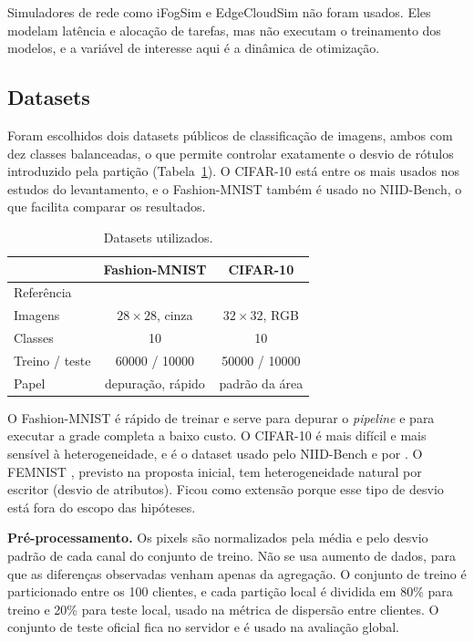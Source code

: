 Simuladores de rede como iFogSim e EdgeCloudSim não foram usados. Eles modelam latência e alocação de tarefas, mas não executam o treinamento dos modelos, e a variável de interesse aqui é a dinâmica de otimização.

\subsection{Datasets}

Foram escolhidos dois datasets públicos de classificação de imagens, ambos com dez classes balanceadas, o que permite controlar exatamente o desvio de rótulos introduzido pela partição (Tabela~\ref{tab:datasets}). O CIFAR-10 está entre os mais usados nos estudos do levantamento, e o Fashion-MNIST também é usado no NIID-Bench, o que facilita comparar os resultados.

\begin{table}[ht]
    \centering\small
    \caption{Datasets utilizados.}
    \label{tab:datasets}
    \begin{tabular}{@{}lcc@{}}
        \toprule
        & Fashion-MNIST & CIFAR-10 \\
        \midrule
        Referência & \citet{xiao2017fashion} & \citet{krizhevsky2009cifar} \\
        Imagens & $28\times28$, cinza & $32\times32$, RGB \\
        Classes & 10 & 10 \\
        Treino / teste & \num{60000} / \num{10000} & \num{50000} / \num{10000} \\
        Papel & depuração, rápido & padrão da área \\
        \bottomrule
    \end{tabular}
\end{table}

O Fashion-MNIST é rápido de treinar e serve para depurar o \textit{pipeline} e para executar a grade completa a baixo custo. O CIFAR-10 é mais difícil e mais sensível à heterogeneidade, e é o dataset usado pelo NIID-Bench \citep{li2022niidbench} e por \citet{enang2026optimiser}. O FEMNIST \citep{caldas2018leaf}, previsto na proposta inicial, tem heterogeneidade natural por escritor (desvio de atributos). Ficou como extensão porque esse tipo de desvio está fora do escopo das hipóteses.

\textbf{Pré-processamento.} Os pixels são normalizados pela média e pelo desvio padrão de cada canal do conjunto de treino. Não se usa aumento de dados, para que as diferenças observadas venham apenas da agregação. O conjunto de treino é particionado entre os 100 clientes, e cada partição local é dividida em 80\% para treino e 20\% para teste local, usado na métrica de dispersão entre clientes. O conjunto de teste oficial fica no servidor e é usado na avaliação global.

